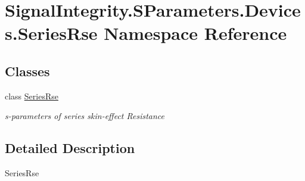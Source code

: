 \hypertarget{namespaceSignalIntegrity_1_1SParameters_1_1Devices_1_1SeriesRse}{}\section{Signal\+Integrity.\+S\+Parameters.\+Devices.\+Series\+Rse Namespace Reference}
\label{namespaceSignalIntegrity_1_1SParameters_1_1Devices_1_1SeriesRse}
\subsection*{Classes}
\begin{DoxyCompactItemize}
\item 
class \hyperlink{classSignalIntegrity_1_1SParameters_1_1Devices_1_1SeriesRse_1_1SeriesRse}{Series\+Rse}
\begin{DoxyCompactList}\small\item\em s-\/parameters of series skin-\/effect Resistance \end{DoxyCompactList}\end{DoxyCompactItemize}


\subsection{Detailed Description}
\begin{DoxyVerb}SeriesRse\end{DoxyVerb}
 